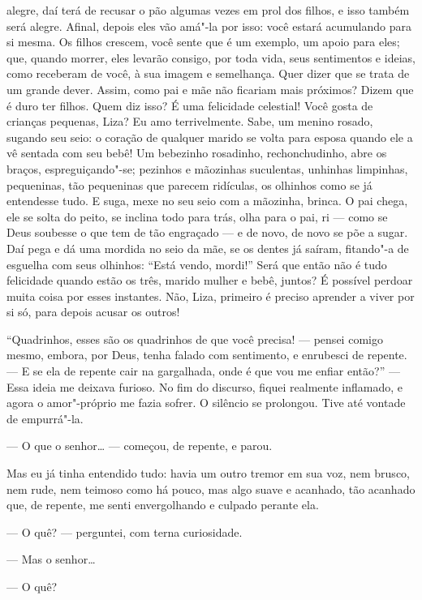alegre, daí terá de recusar o pão algumas vezes em prol dos filhos, e
isso também será alegre. Afinal, depois eles vão amá"-la por isso: você
estará acumulando para si mesma. Os filhos crescem, você sente que é um
exemplo, um apoio para eles; que, quando morrer, eles levarão consigo,
por toda vida, seus sentimentos e ideias, como receberam de você, à sua
imagem e semelhança. Quer dizer que se trata de um grande dever. Assim,
como pai e mãe não ficariam mais próximos? Dizem que é duro ter filhos.
Quem diz isso? É uma felicidade celestial! Você gosta de crianças
pequenas, Liza? Eu amo terrivelmente. Sabe, um menino rosado, sugando
seu seio: o coração de qualquer marido se volta para esposa quando ele a
vê sentada com seu bebê! Um bebezinho rosadinho, rechonchudinho, abre os
braços, espreguiçando"-se; pezinhos e mãozinhas suculentas, unhinhas
limpinhas, pequeninas, tão pequeninas que parecem ridículas, os olhinhos
como se já entendesse tudo. E suga, mexe no seu seio com a mãozinha,
brinca. O pai chega, ele se solta do peito, se inclina todo para trás,
olha para o pai, ri --- como se Deus soubesse o que tem de tão engraçado
--- e de novo, de novo se põe a sugar. Daí pega e dá uma mordida no seio
da mãe, se os dentes já saíram, fitando"-a de esguelha com seus olhinhos:
``Está vendo, mordi!'' Será que então não é tudo felicidade quando estão
os três, marido mulher e bebê, juntos? É possível perdoar muita coisa
por esses instantes. Não, Liza, primeiro é preciso aprender a viver por
si só, para depois acusar os outros!

``Quadrinhos, esses são os quadrinhos de que você precisa! --- pensei
comigo mesmo, embora, por Deus, tenha falado com sentimento, e enrubesci
de repente. --- E se ela de repente cair na gargalhada, onde é que vou me
enfiar então?'' --- Essa ideia me deixava furioso. No fim do discurso,
fiquei realmente inflamado, e agora o amor"-próprio me fazia sofrer. O
silêncio se prolongou. Tive até vontade de empurrá"-la.

--- O que o senhor\ldots{} --- começou, de repente, e parou.

Mas eu já tinha entendido tudo: havia um outro tremor em sua voz, nem
brusco, nem rude, nem teimoso como há pouco, mas algo suave e acanhado,
tão acanhado que, de repente, me senti envergolhando e culpado perante
ela.

--- O quê? --- perguntei, com terna curiosidade.

--- Mas o senhor\ldots{}

--- O quê?

